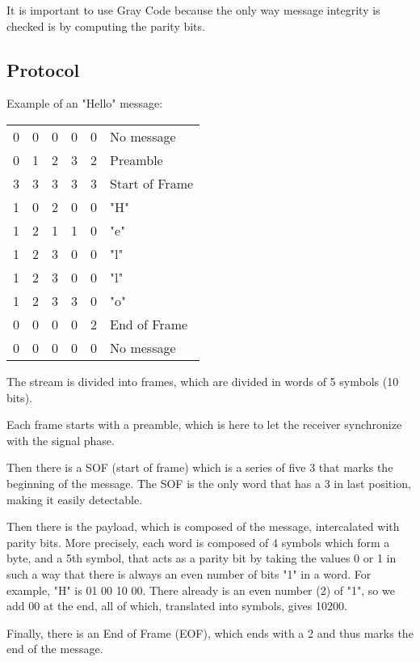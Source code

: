 \documentclass[12pt]{report}
\begin{document}
It is important to use Gray Code because the only way message integrity is checked is by computing the parity bits.

\subsection{Protocol}

Example of an "Hello" message:

\begin{center}
\begin{tabular}{ccccc|l}
0&0&0&0&0&No message\\
0&1&2&3&2&Preamble\\
3&3&3&3&3&Start of Frame\\
1&0&2&0&0&"H"\\
1&2&1&1&0&"e"\\
1&2&3&0&0&"l"\\
1&2&3&0&0&"l"\\
1&2&3&3&0&"o"\\
0&0&0&0&2&End of Frame\\
0&0&0&0&0&No message\\
\end{tabular}
\end{center}

The stream is divided into frames, which are divided in words of 5 symbols (10 bits).

 Each frame starts with a preamble, which is here to let the receiver synchronize with the signal phase.

Then there is a SOF (start of frame) which is a series of five 3 that marks the beginning of the message. The SOF is the only word that has a 3 in last position, making it easily detectable.

Then there is the payload, which is composed of the message, intercalated with parity bits. More precisely, each word is composed of 4 symbols which form a byte, and a 5th symbol, that acts as a parity bit by taking the values 0 or 1 in such a way that there is always an even number of bits "1" in a word.
For example, "H" is 01 00 10 00. There already is an even number (2) of "1", so we add 00 at the end, all of which, translated into symbols, gives 10200.

Finally, there is an End of Frame (EOF), which ends with a 2 and thus marks the end of the message.
\end{document}
